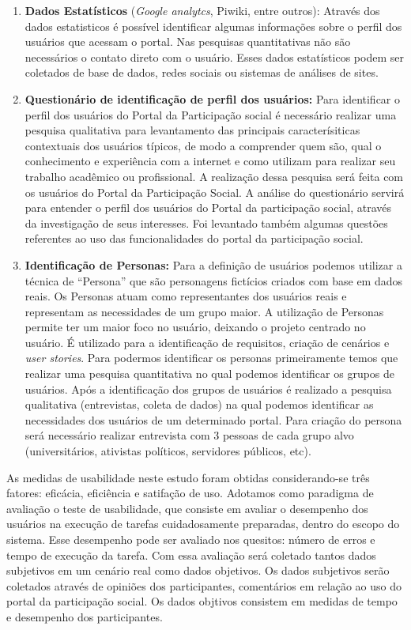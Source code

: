 \begin{enumerate}
\item \textbf{Dados Estatísticos} (\textit{Google analytcs}, Piwiki, entre outros): Através dos dados estatisticos é possível identificar algumas informações sobre o perfil dos usuários que acessam o portal. Nas pesquisas quantitativas não são necessários o contato direto com o usuário. Esses dados estatísticos podem ser coletados de base de dados, redes sociais ou sistemas de análises de sites.

\item \textbf{Questionário de identificação de perfil dos usuários:} Para identificar o perfil dos usuários do Portal da Participação social é necessário realizar uma pesquisa qualitativa para levantamento das principais caracterísiticas contextuais dos usuários típicos, de modo a comprender quem são, qual o conhecimento e experiência com a internet e como utilizam para realizar seu trabalho acadêmico ou profissional. A realização dessa pesquisa será feita com os usuários do Portal da Participação Social.
%
A análise do questionário servirá para entender o perfil dos usuários do Portal da participação social, através da investigação de seus interesses. Foi levantado também algumas questões referentes ao uso das funcionalidades do portal da participação social.

\item \textbf{Identificação de Personas:} Para a definição de usuários podemos utilizar a técnica de “Persona” que são personagens fictícios criados com base em dados reais. Os Personas atuam como representantes dos usuários reais e representam as necessidades de um grupo maior. 
%
A utilização de Personas permite ter um maior foco no usuário, deixando o projeto centrado no usuário. É utilizado para a identificação de requisitos, criação de cenários e \textit{user stories}. 
%
Para podermos identificar os personas primeiramente temos que realizar uma pesquisa quantitativa no qual podemos identificar os grupos de usuários. Após a identificação dos grupos de usuários é realizado a pesquisa qualitativa (entrevistas, coleta de dados) na qual podemos identificar as necessidades dos usuários de um determinado portal.
%
Para criação do persona será necessário realizar entrevista com 3 pessoas de cada grupo alvo (universitários, ativistas políticos, servidores públicos, etc).

\end{enumerate}

As medidas de usabilidade neste estudo foram obtidas considerando-se três fatores: eficácia, eficiência e satifação de uso.
%
Adotamos como paradigma de avaliação o teste de usabilidade, que consiste em avaliar o desempenho dos usuários na execução de tarefas cuidadosamente preparadas, dentro do escopo do sistema. Esse desempenho pode ser avaliado nos quesitos: número de erros e tempo de execução da tarefa. Com essa avaliação será coletado tantos dados subjetivos em um cenário real como dados objetivos. Os dados subjetivos serão coletados através de opiniões dos participantes, comentários em relação ao uso do portal da participação social. Os dados objtivos consistem em medidas de tempo e desempenho dos participantes.

